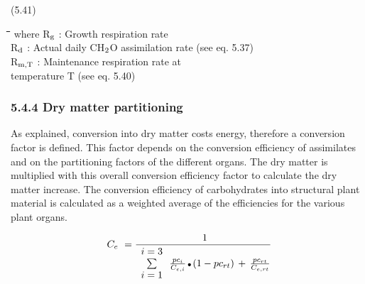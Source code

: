 \documentclass[11pt]{article}
\begin{document}
 \bigskip
\strut\hfill (5.41)
\nwln
\begin{tabbing}
\hspace{1.27cm}\=\hspace{1.27cm}\=\hspace{1.27cm}\=\hspace{1.27cm}\=%
\hspace{1.27cm}\=\hspace{1.27cm}\=\hspace{1.27cm}\=\hspace{1.27cm}\=%
\hspace{1.27cm}\=\hspace{1.27cm}\=\kill
where\> R$_{{\rm g}}$\> : Growth respiration rate\> \> \> \> \> \> \> \> [kg ha$^{{\rm -1}}$ d$^{{\rm -1}}$]\\
\>R$_{{\rm d}}$\> : Actual daily CH$_{{\rm 2}}$O assimilation rate (see eq. 5.37)\> \> \> \> \> \> \> \> [kg ha$^{{\rm -1}}$ d$^{{\rm -1}}$]\\
\>R$_{{\rm m,T}}$\> : Maintenance respiration rate at \\
\>\>   temperature T (see eq. 5.40)\> \> \> \> \> \> \> \> [kg ha$^{{\rm -1}}$ d$^{{\rm -1}}$]
\end{tabbing}

\bigskip
\bigskip

\subsubsection{  5.4.4 Dry matter partitioning  }

As explained, conver\-sion into dry matter costs energy, therefore a conversion factor is
defined. This factor depends on the conversion efficiency of assimi\-lates and on the
partition\-ing factors of the different organs. The dry matter is multiplied with this overall
conver\-sion efficiency factor to calculate the dry matter increase. The conver\-sion effi\-ciency of carbohy\-drates into structural plant material is calculated as a weighted average
of the efficiencies for the various plant organs.

\begin{displaymath}
C _{e} ~={\frac{~1}{\begin{array}{c}{i=3}  \\
\sum  \\
{i=1}\end{array} \,{\frac{pc _{i} }{C _{e,i} }} \, {\rm \Bullet{0.75ex}}\, (1-pc _{rt} )\, +\,{\frac{ pc _{rt} }{C _{e,rt} }} }}
\end{displaymath}
\end{document}
